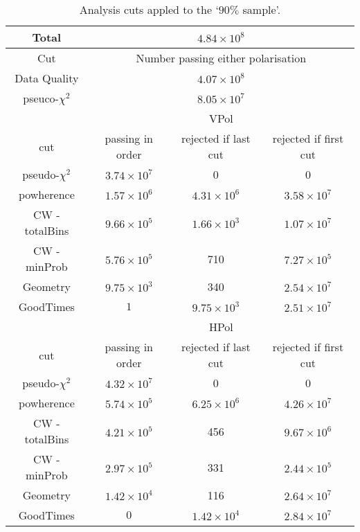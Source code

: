 \begin{table}
  \begin{center}
    \begin{tabular}{ c || c | c | c }
      Total & \multicolumn{3}{c}{ $4.84 \times 10^{8}$}\\
      \hline
      Cut & \multicolumn{3}{c}{ Number passing either polarisation}\\      
      \hline
      Data Quality & \multicolumn{3}{c}{$4.07 \times 10^8$}\\
      pseuco-$\chi^{2}$ & \multicolumn{3}{c}{$8.05 \times 10^7$}\\
      \hline\hline
      & \multicolumn{3}{c}{VPol}\\
      \hline
      cut & passing in order & rejected if last cut & rejected if first cut \\
      \hline
      pseudo-$\chi^{2}$ & $3.74 \times 10^7$ & 0 & 0\\
      powherence & $1.57 \times 10^6$ & $4.31 \times 10^6$ & $3.58 \times 10^7$\\
      CW - totalBins & $9.66 \times 10^5$ & $1.66 \times 10^3$ & $1.07 \times 10^7$\\
      CW - minProb & $5.76 \times 10^5$ & 710 & $7.27 \times 10^5$\\
      Geometry & $9.75 \times 10^3$ & 340 & $2.54 \times 10^7$\\
      GoodTimes & $1$ & $9.75 \times 10^3$ & $2.51 \times 10^7$\\
      \hline\hline
      & \multicolumn{3}{c}{HPol}\\
      \hline
      cut & passing in order & rejected if last cut & rejected if first cut \\
      \hline
      pseudo-$\chi^{2}$ & $4.32 \times 10^7$ & 0 & 0\\
      powherence & $5.74 \times 10^5$ & $6.25 \times 10^6$ & $4.26 \times 10^7$\\
      CW - totalBins & $4.21 \times 10^5$ & 456 & $9.67 \times 10^6$\\
      CW - minProb & $2.97 \times 10^5$ & 331 & $2.44 \times 10^5$\\
      Geometry & $1.42 \times 10^4$ & 116 & $2.64 \times 10^7$\\
      GoodTimes & $0$ & $1.42 \times 10^4$ & $2.84 \times 10^7$\\      
      \end{tabular} 
    \caption{Analysis cuts appled to the `$90 \%$ sample'.}
    \label{tab:Analysis:Cut-Flow}
  \end{center}
\end{table}

